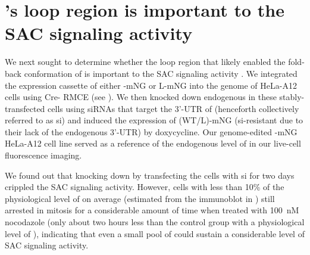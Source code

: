 
\section{'s loop region is important to the SAC signaling activity }
\label{LoopDeletionSection}

We next sought to determine whether the loop region that likely enabled the fold-back conformation of  is important to the SAC signaling activity . We integrated the expression cassette of either -mNG or \textDelta{}L-mNG into the genome of HeLa-A12 cells using Cre- RMCE (see ). We then knocked down endogenous  in these stably-transfected cells using siRNAs that target the 3'-UTR of  \cite{siMAD1-3UTR} (henceforth collectively referred to as si) and induced the expression of (WT/\textDelta{}L)-mNG (si-resistant due to their lack of the endogenous 3'-UTR) by doxycycline. Our genome-edited -mNG HeLa-A12 cell line served as a reference of the endogenous level of  in our live-cell fluorescence imaging.

We found out that knocking down  by transfecting the cells with si for two days crippled the SAC signaling activity. However, cells with less than 10\% of the physiological level of  on average (estimated from the immunoblot in ) still arrested in mitosis for a considerable amount of time when treated with \SI{100}{nM} nocodazole (only about two hours less than the control group with a physiological level of ), indicating that even a small pool of  could sustain a considerable level of SAC signaling activity.


